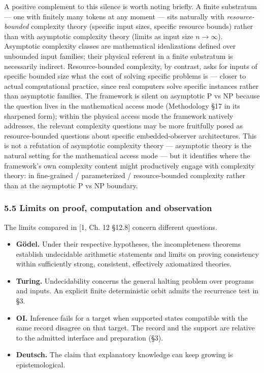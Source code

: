\documentclass[
]{article}
\begin{document}
A positive complement to this silence is worth noting briefly. A finite
substratum --- one with finitely many tokens at any moment --- sits
naturally with \emph{resource-bounded} complexity theory (specific input
sizes, specific resource bounds) rather than with asymptotic complexity
theory (limits as input size \(n \to \infty\)). Asymptotic complexity
classes are mathematical idealizations defined over unbounded input
families; their physical referent in a finite substratum is necessarily
indirect. Resource-bounded complexity, by contrast, asks for inputs of
specific bounded size what the cost of solving specific problems is ---
closer to actual computational practice, since real computers solve
specific instances rather than asymptotic families. The framework is
silent on asymptotic P vs NP because the question lives in the
mathematical access mode (Methodology §17 in its sharpened form); within
the physical access mode the framework natively addresses, the relevant
complexity questions may be more fruitfully posed as resource-bounded
questions about specific embedded-observer architectures. This is not a
refutation of asymptotic complexity theory --- asymptotic theory is the
natural setting for the mathematical access mode --- but it identifies
where the framework's own complexity content might productively engage
with complexity theory: in fine-grained / parameterized /
resource-bounded complexity rather than at the asymptotic P vs NP
boundary.

\hypertarget{limits-on-proof-computation-and-observation}{%
\subsubsection{5.5 Limits on proof, computation and
observation}\label{limits-on-proof-computation-and-observation}}

The limits compared in {[}1, Ch. 12 §12.8{]} concern different
questions.

\begin{itemize}
\item
  \textbf{Gödel.} Under their respective hypotheses, the incompleteness
  theorems establish undecidable arithmetic statements and limits on
  proving consistency within sufficiently strong, consistent,
  effectively axiomatized theories.
\item
  \textbf{Turing.} Undecidability concerns the general halting problem
  over programs and inputs. An explicit finite deterministic orbit
  admits the recurrence test in §3.
\item
  \textbf{OI.} Inference fails for a target when supported states
  compatible with the same record disagree on that target. The record
  and the support are relative to the admitted interface and preparation
  (§3).
\item
  \textbf{Deutsch.} The claim that explanatory knowledge can keep
  growing is epistemological.
\end{itemize}
\end{document}
